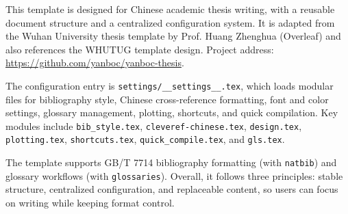 



\begin{enabstract}
This template is designed for Chinese academic thesis writing, with a reusable document structure and a centralized configuration system.
It is adapted from the Wuhan University thesis template by Prof. Huang Zhenghua (Overleaf) and also references the WHUTUG template design.
Project address: \url{https://github.com/yanboc/yanboc-thesis}.

The configuration entry is \texttt{settings/\_\_settings\_\_.tex}, which loads modular files for bibliography style, Chinese cross-reference formatting, font and color settings, glossary management, plotting, shortcuts, and quick compilation.
Key modules include \texttt{bib\_style.tex}, \texttt{cleveref-chinese.tex}, \texttt{design.tex}, \texttt{plotting.tex}, \texttt{shortcuts.tex}, \texttt{quick\_compile.tex}, and \texttt{gls.tex}.

The template supports GB/T 7714 bibliography formatting (with \texttt{natbib}) and glossary workflows (with \texttt{glossaries}).
Overall, it follows three principles: stable structure, centralized configuration, and replaceable content, so users can focus on writing while keeping format control.
\end{enabstract}
\vspace{1em}\par\vfill

